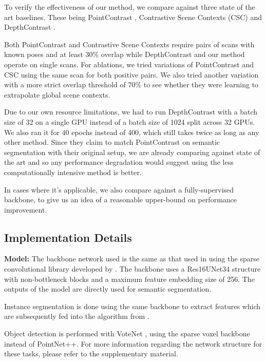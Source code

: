 \documentclass[10pt,twocolumn,letterpaper]{article}
\begin{document}
To verify the effectiveness of our method, we compare against three state of the art baselines. These being PointContrast \cite{xie2020pointcontrast}, Contrastive Scene Contexts (CSC) \cite{hou2021Exploring} and DepthContrast \cite{zhang2021Self}.

Both PointContrast and Contrastive Scene Contexts require pairs of scans with known poses and at least 30\% overlap while DepthContrast and our method operate on single scans. For ablations, we tried variations of PointContrast and CSC using the same scan for both positive pairs. We also tried another variation with a more strict overlap threshold of 70\% to see whether they were learning to extrapolate global scene contexts.

Due to our own resource limitations, we had to run DepthContrast with a batch size of 32 on a single GPU instead of a batch size of 1024 split across 32 GPUs. We also ran it for 40 epochs instead of 400, which still takes twice as long as any other method. Since they claim to match PointContrast on semantic segmentation with their original setup, we are already comparing against state of the art and so any performance degradation would suggest using the less computationally intensive method is better.

In cases where it's applicable, we also compare against a fully-supervised backbone, to give us an idea of a reasonable upper-bound on performance improvement.

\subsection{Implementation Details}
\label{sec:results:implementation}

\textbf{Model:} The backbone network used is the same as that used in \cite{xie2020pointcontrast, hou2021Exploring} using the sparse convolutional library developed by \cite{choy20194d}. The backbone uses a Res16UNet34 structure with non-bottleneck blocks and a maximum feature embedding size of 256. The outputs of the model are directly used for semantic segmentation.

Instance segmentation is done using the same backbone to extract features which are subsequently fed into the algorithm from \cite{jiang2020pointgroup}.

Object detection is performed with VoteNet \cite{qi2019deep}, using the sparse voxel backbone instead of PointNet++. For more information regarding the network structure for these tasks, please refer to the supplementary material.
\end{document}
